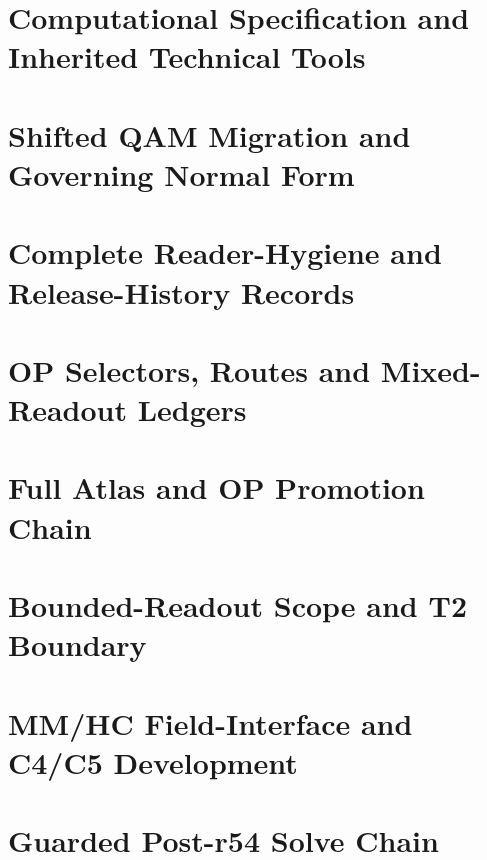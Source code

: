 \section{Computational Specification and Inherited Technical Tools}
\label{v480:support-computation}




\section{Shifted QAM Migration and Governing Normal Form}
\label{v480:support-shift}


\section{Complete Reader-Hygiene and Release-History Records}
\label{v480:support-hygiene}


\section{OP Selectors, Routes and Mixed-Readout Ledgers}
\label{v480:support-selector}


\section{Full Atlas and OP Promotion Chain}
\label{v480:support-atlas}


\section{Bounded-Readout Scope and T2 Boundary}
\label{v480:support-bounded}


\section{MM/HC Field-Interface and C4/C5 Development}
\label{v480:support-mm-c5}


\section{Guarded Post-r54 Solve Chain}
\label{v480:support-solve}



